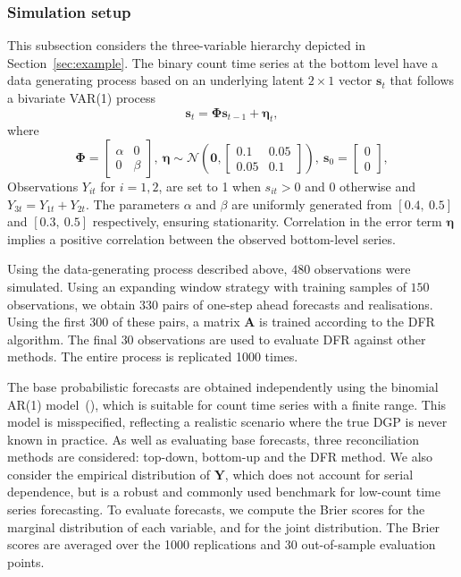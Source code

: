 \documentclass[a4paper,review,11pt,authoryear]{elsarticle}
\theoremstyle{definition}
\begin{document}
    \subsubsection{Simulation setup}
    This subsection considers the three-variable hierarchy depicted in Section~\ref{sec:example}. The binary count time series at the bottom level have a data generating process based on an underlying latent $2\times 1$ vector $\mathbf{s}_t$ that follows a bivariate VAR(1) process
    \[\mathbf{s}_t = \mathbf{\Phi}\mathbf{s}_{t-1}+\boldsymbol{\eta}_t,\]
    where
    \[
      \mathbf{\Phi} = \left[\begin{matrix}
        \alpha & 0 \\
        0 & \beta
      \end{matrix}\right], ~ \boldsymbol{\eta} \sim \mathcal{N}\left(\mathbf{0}, \left[\begin{matrix}
        0.1 & 0.05 \\
        0.05 & 0.1
      \end{matrix}\right]\right), ~ \mathbf{s}_{0} = \left[
        \begin{matrix}0 \\ 0\end{matrix}
      \right],
    \]
    Observations $Y_{it}$ for $i=1,2$, are set to 1 when $s_{it}>0$ and 0 otherwise and $Y_{3t}=Y_{1t}+Y_{2t}$. The parameters $\alpha$ and $\beta$ are uniformly generated from $[0.4, ~ 0.5]$ and $[0.3, ~ 0.5]$ respectively, ensuring stationarity. Correlation in the error term $\boldsymbol{\eta}$ implies a positive correlation between the observed bottom-level series.

   
    Using the data-generating process described above, $480$ observations were simulated. Using an expanding window strategy with training samples of $150$ observations, we obtain $330$ pairs of one-step ahead forecasts and realisations. Using the first $300$ of these pairs, a matrix $\mathbf{A}$ is trained according to the DFR algorithm. The final $30$ observations are used to evaluate DFR against other methods. The entire process is replicated 1000 times.
    

    The base probabilistic forecasts are obtained independently using the binomial AR(1) model~(\citealp{weissParameterEstimationBinomial2013}), which is suitable for count time series with a finite range. This model is misspecified, reflecting a realistic scenario where the true DGP is never known in practice. As well as evaluating base forecasts, three reconciliation methods are considered: top-down, bottom-up and the DFR method. We also consider the empirical distribution of $\mathbf{Y}$, which does not account for serial dependence, but is a robust and commonly used benchmark for low-count time series forecasting. To evaluate forecasts, we compute the Brier scores for the marginal distribution of each variable, and for the joint distribution. The Brier scores are averaged over the 1000 replications and 30 out-of-sample evaluation points.
\end{document}
